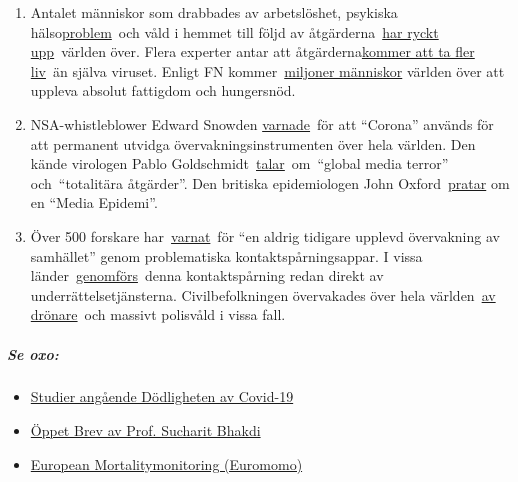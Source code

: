 \begin{enumerate}
{  skador~} ch skadestånd i miljoner.
\item
  Antalet människor som drabbades av arbetslöshet, psykiska
  hälso\href{https://www.indystar.com/story/news/health/2020/04/03/coronavirus-indiana-how-get-help-mental-health-addiction/5104357002/}{problem}~och
  våld i hemmet till följd av
  åtgärderna~\href{https://www.reuters.com/article/us-health-coronavirus-usa-layoffs/us-weekly-jobless-claims-seen-at-record-high-again-idUSKBN21K0FX}{har
  ryckt upp}~världen över. Flera experter antar att
  åtgärderna\href{https://www.nytimes.com/2020/03/20/opinion/coronavirus-pandemic-social-distancing.html}{kommer
  att ta fler liv}~än själva viruset. Enligt FN
  kommer~\href{https://de.euronews.com/2020/04/22/un-warnen-welt-droht-wegen-corona-eine-hunger-pandemie-von-biblischen-ausma-en}{miljoner
  människor} världen över att uppleva absolut fattigdom och hungersnöd.
\item
  NSA-whistleblower Edward Snowden
  \href{https://www.youtube.com/watch?v=-pcQFTzck_c}{varnade}~för att
  ``Corona'' används för att permanent utvidga övervakningsinstrumenten
  över hela världen. Den kände virologen Pablo
  Goldschmidt~\href{https://www.rubikon.news/artikel/der-corona-totalitarismus}{talar}~om~``global
  media terror'' och~``totalitära åtgärder''. Den britiska epidemiologen
  John
  Oxford~\href{https://novuscomms.com/2020/03/31/a-view-from-the-hvivo-open-orphan-orph-laboratory-professor-john-oxford/}{pratar}
  om en ``Media Epidemi''.
\item
  Över 500 forskare
  har~\href{https://www.esat.kuleuven.be/cosic/sites/contact-tracing-joint-statement/}{varnat}~för
  ``en aldrig tidigare upplevd övervakning av samhället'' genom
  problematiska kontaktspårningsappar. I vissa
  länder~\href{https://www.jewishpress.com/news/the-courts/state-to-high-court-even-more-shin-bet-involvement-in-fighting-the-coronavirus/2020/04/14/}{genomförs}~denna
  kontaktspårning redan direkt av underrättelsetjänsterna.
  Civilbefolkningen övervakades över hela
  världen~\href{https://off-guardian.org/2020/04/25/50-headlines-darker-more-of-the-new-normal/}{av
  drönare}~och massivt polisvåld i vissa fall.
\end{enumerate}

\hypertarget{se-oxo}{%
\subparagraph{\texorpdfstring{\textbf{Se oxo:}}{Se oxo:}}\label{se-oxo}}

\begin{itemize}
\tightlist
\item
  \href{https://swprs.org/studies-on-covid-19-lethality/}{Studier
  angående Dödligheten av Covid-19}
\item
  \href{https://swprs.org/open-letter-from-professor-sucharit-bhakdi-to-german-chancellor-dr-angela-merkel/}{Öppet
  Brev av Prof. Sucharit Bhakdi}
\item
  \href{https://www.euromomo.eu/}{European Mortalitymonitoring
  (Euromomo)}
\end{itemize}

